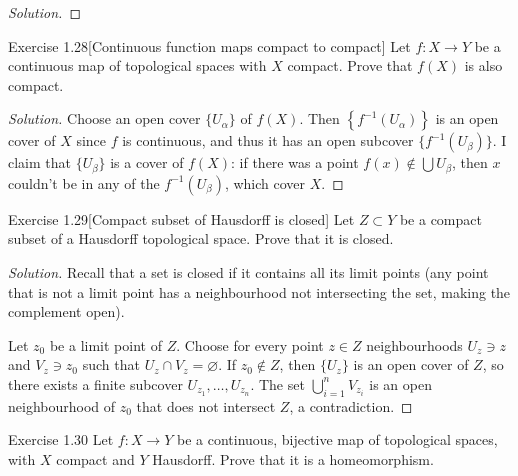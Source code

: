 \begin{proof}[Solution]\leavevmode
\end{proof}\fi


\begin{thing4}{Exercise 1.28}[Continuous function maps compact to compact]\label{exer:1.28}\label{exer:1.28}\leavevmode
Let $f:X\to Y$ be a continuous map of topological spaces with $X$ compact. Prove that $f(X)$ is also compact.
\end{thing4}

\begin{proof}[Solution]\leavevmode
	Choose an open cover $\{U_\alpha\}$ of $f(X)$. Then  $\left\{f^{-1}\left( U_\alpha \right) \right\}$ is an open cover of $X$ since $f$ is continuous, and thus it has an open subcover $\{f^{-1}(U_\beta)\}$. I claim that $\{U_\beta\}$ is a cover of $f(X)$: if there was a point $f(x) \not \in \bigcup U_\beta $, then $x$ couldn't be in any of the  $f^{-1}(U_\beta)$, which cover $X$. 
\end{proof}

\begin{thing4}{Exercise 1.29}[Compact subset of Hausdorff is closed]\label{exer:1.29}\label{exer:1.29}\leavevmode
Let $Z \subset Y$ be a compact subset of a Hausdorff topological space. Prove that it is closed.
\end{thing4}

\begin{proof}[Solution]\leavevmode
Recall that a set is closed if it contains all its limit points (any point that is not a limit point has a neighbourhood not intersecting the set, making the complement open).

Let $z_0$ be a limit point of $Z$. Choose for every point $z \in Z$ neighbourhoods $U_z \ni z$ and $V_z \ni z_0$ such that $U_z \cap V_z=\varnothing$. If $z_0 \not\in Z$, then $\{U_z\}$ is an open cover of $Z$, so there exists a finite subcover $U_{z_1},\ldots,U_{z_n}$. The set $\bigcup_{i=1}^n V_{z_i}$ is an open neighbourhood of $z_0$ that does not intersect $Z$, a contradiction.
\end{proof}

\begin{thing4}{Exercise 1.30}\label{exer:1.30}\leavevmode
Let $f:X \to Y$ be a continuous, bijective map of topological spaces, with $X$ compact and $Y$ Hausdorff. Prove that it is a homeomorphism.
\end{thing4}

